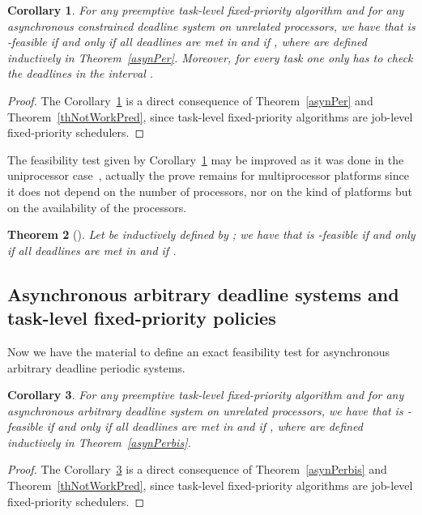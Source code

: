 \documentclass[a4paper,11pt]{article}
\newtheorem{Theorem}{Theorem}
\newtheorem{Corollary}[Theorem]{Corollary}
\begin{document}
\begin{Corollary}\label{help} 
For any preemptive task-level fixed-priority algorithm  and for any asynchronous constrained deadline system  on  unrelated processors, we have that  is -feasible if and only if all deadlines are met in  and if , where  are defined inductively in Theorem~\ref{asynPer}. Moreover, for every task  one only has to check the deadlines in the interval .
\end{Corollary}

\begin{proof}
The Corollary~\ref{help} is a direct consequence of Theorem~\ref{asynPer} and Theorem~\ref{thNotWorkPred}, since task-level fixed-priority algorithms are job-level fixed-priority schedulers.
\end{proof}

The feasibility test given by Corollary~\ref{help} may be improved
as it was done in the uniprocessor case~\cite{Goossens2}, actually the prove remains for multiprocessor platforms since it  does not depend on the number of processors, nor on the kind of platforms but on the availability of the processors.

\begin{Theorem}[\cite{Goossens2}]\label{thLowBoundInt} Let  be
  inductively defined by  ; we have that  is -feasible if and only if all deadlines are met in  and if .
  \end{Theorem}

\subsection{Asynchronous arbitrary deadline systems and task-level fixed-priority policies}

Now we have the material to define an exact feasibility test for
asynchronous arbitrary deadline periodic systems.

\begin{Corollary}\label{helpbis} For any preemptive task-level fixed-priority algorithm  and for any asynchronous arbitrary deadline system  on  unrelated
processors, we have that  is -feasible if and only if all deadlines are met in  and if , where  are defined inductively in Theorem~\ref{asynPerbis}.
\end{Corollary}

\begin{proof}
  The Corollary~\ref{helpbis} is a direct consequence of
  Theorem~\ref{asynPerbis} and Theorem~\ref{thNotWorkPred}, since task-level   fixed-priority algorithms are job-level fixed-priority schedulers.
\end{proof}
\end{document}
